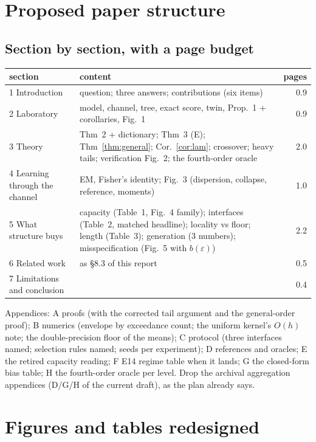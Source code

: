 \section{Proposed paper structure}
\label{sec:structure}
\subsection{Section by section, with a page budget}

\begin{tabular}{@{}lp{9.6cm}r@{}}
\toprule
section & content & pages \\
\midrule
1 Introduction & question; three answers; contributions (six items) & 0.9 \\
2 Laboratory & model, channel, tree, exact score, twin, Prop.~1 + corollaries, Fig.~1 & 0.9 \\
3 Theory & Thm~2 + dictionary; Thm~3 (E); Thm~\ref{thm:general}; Cor.~\ref{cor:lam}; crossover; heavy tails; verification Fig.~2; the fourth-order oracle & 2.0 \\
4 Learning through the channel & EM, Fisher's identity; Fig.~3 (dispersion, collapse, reference, moments) & 1.0 \\
5 What structure buys & capacity (Table~1, Fig.~4 family); interfaces (Table~2, matched headline); locality vs floor; length (Table~3); generation (3 numbers); misspecification (Fig.~5 with $b(\varepsilon)$) & 2.2 \\
6 Related work & as \S8.3 of this report & 0.5 \\
7 Limitations and conclusion & & 0.4 \\
\bottomrule
\end{tabular}

\noindent Appendices: A proofs (with the corrected tail argument and the general-order proof); B numerics (envelope by exceedance count; the uniform kernel's $O(h)$ note; the double-precision floor of the means); C protocol (three interfaces named; selection rules named; seeds per experiment); D references and oracles; E the retired capacity reading; F E14 regime table when it lands; G the closed-form bias table; H the fourth-order oracle per level. Drop the archival aggregation appendices (D/G/H of the current draft), as the plan already says.

\section{Figures and tables redesigned}
\label{sec:figures}


